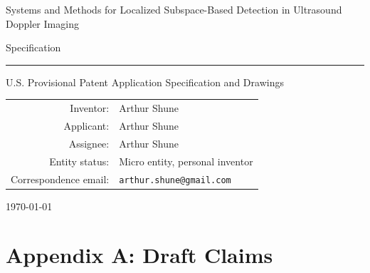 \documentclass[11pt]{article}
\begin{document}

\begin{titlepage}
\centering
{\Large Systems and Methods for Localized Subspace-Based Detection in Ultrasound Doppler Imaging\par}
\vspace{1.5cm}
{\large Specification\par}
\vspace{0.8cm}
\rule{0.72\textwidth}{0.6pt}\par
\vspace{0.8cm}
{\large U.S. Provisional Patent Application Specification and Drawings\par}
\vspace{1.4cm}
\begin{tabular}{rl}
Inventor: & Arthur Shune \\
Applicant: & Arthur Shune \\
Assignee: & Arthur Shune \\
Entity status: & Micro entity, personal inventor \\
Correspondence email: & \texttt{arthur.shune@gmail.com} \\
\end{tabular}
\vfill
{\large \today\par}
\end{titlepage}

\clearpage
{}
\setcounter{page}{1}

\tableofcontents
\clearpage



\clearpage
\section*{Appendix A: Draft Claims}
\end{document}
